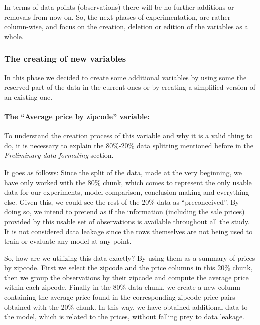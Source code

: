 \documentclass[table]{article}
\let\oldparagraph\paragraph
\renewcommand{\paragraph}[1]{\oldparagraph{#1}\mbox{}}
\begin{document}
In terms of data points (observations) there will be no further
additions or removals from now on. So, the next phases of
experimentation, are rather column-wise, and focus on the creation,
deletion or edition of the variables as a whole.

\subsubsection{The creating of new
variables}\label{the-creating-of-new-variables}

In this phase we decided to create some additional variables by using
some the reserved part of the data in the current ones or by creating a
simplified version of an existing one.

\paragraph{\texorpdfstring{The ``Average price by zipcode''
variable:}{The Average price by zipcode variable:}}\label{the-average-price-by-zipcode-variable}

To understand the creation process of this variable and why it is a
valid thing to do, it is necessary to explain the 80\%-20\% data
splitting mentioned before in the \emph{Preliminary data formating}
section.

It goes as follows: Since the split of the data, made at the very
beginning, we have only worked with the 80\% chunk, which comes to
represent the only usable data for our experiments, model comparison,
conclusion making and everything else. Given this, we could see the rest
of the 20\% data as ``preconceived''. By doing so, we intend to pretend
as if the information (including the sale prices) provided by this
usable set of observations is available throughout all the study. It is
not considered data leakage since the rows themselves are not being used
to train or evaluate any model at any point.

So, how are we utilizing this data exactly? By using them as a summary
of prices by zipcode. First we select the zipcode and the price columns
in this 20\% chunk, then we group the observations by their zipcode and
compute the average price within each zipcode. Finally in the 80\% data
chunk, we create a new column containing the average price found in the
corresponding zipcode-price pairs obtained with the 20\% chunk. In this
way, we have obtained additional data to the model, which is related to
the prices, without falling prey to data leakage. \hfill\break
\end{document}
